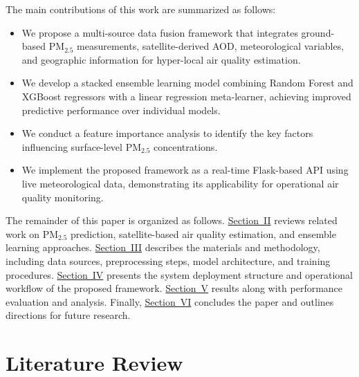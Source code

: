 \documentclass[conference]{IEEEtran}
\begin{document}
The main contributions of this work are summarized as follows:
\begin{itemize}
\item We propose a multi-source data fusion framework that integrates ground-based PM$_{2.5}$ measurements, satellite-derived AOD, meteorological variables, and geographic information for hyper-local air quality estimation.
\item We develop a stacked ensemble learning model combining Random Forest and XGBoost regressors with a linear regression meta-learner, achieving improved predictive performance over individual models.
\item We conduct a feature importance analysis to identify the key factors influencing surface-level PM$_{2.5}$ concentrations.
\item We implement the proposed framework as a real-time Flask-based API using live meteorological data, demonstrating its applicability for operational air quality monitoring.
\end{itemize}

The remainder of this paper is organized as follows. 
\hyperref[sec:literature]{Section~II} reviews related work on PM$_{2.5}$ prediction, satellite-based air quality estimation, and ensemble learning approaches. 
\hyperref[sec:methodology]{Section~III} describes the materials and methodology, including data sources, preprocessing steps, model architecture, and training procedures. 
\hyperref[sec:deployment]{Section~IV} presents the system deployment structure and operational workflow of the proposed framework. 
\hyperref[sec:results]{Section~V} results along with performance evaluation and analysis. 
Finally, \hyperref[sec:conclusion]{Section~VI} concludes the paper and outlines directions for future research.






\section{Literature Review}
\label{sec:literature}
\end{document}
